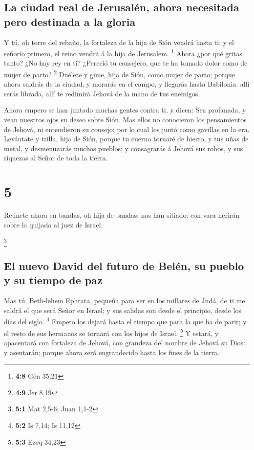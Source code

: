 \hypertarget{la-ciudad-real-de-jerusaluxe9n-ahora-necesitada-pero-destinada-a-la-gloria}{%
\subsection{La ciudad real de Jerusalén, ahora necesitada pero destinada
a la
gloria}\label{la-ciudad-real-de-jerusaluxe9n-ahora-necesitada-pero-destinada-a-la-gloria}}

 Y tú, oh torre del rebaño, la fortaleza de la hija de Sión
vendrá hasta ti: y el señorío primero, el reino vendrá á la hija de
Jerusalem. \footnote{\textbf{4:8} Gén 35,21}  Ahora ¿por qué
gritas tanto? ¿No hay rey en ti? ¿Pereció tu consejero, que te ha tomado
dolor como de mujer de parto? \footnote{\textbf{4:9} Jer 8,19}
 Duélete y gime, hija de Sión, como mujer de parto; porque
ahora saldrás de la ciudad, y morarás en el campo, y llegarás hasta
Babilonia: allí serás librada, allí te redimirá Jehová de la mano de tus
enemigos.

 Ahora empero se han juntado muchas gentes contra ti, y
dicen: Sea profanada, y vean nuestros ojos su deseo sobre Sión.
 Mas ellos no conocieron los pensamientos de Jehová, ni
entendieron su consejo: por lo cual los juntó como gavillas en la era.
 Levántate y trilla, hija de Sión, porque tu cuerno tornaré
de hierro, y tus uñas de metal, y desmenuzarás muchos pueblos; y
consagrarás á Jehová sus robos, y sus riquezas al Señor de toda la
tierra.

\hypertarget{section-4}{%
\section{5}\label{section-4}}

 Reúnete ahora en bandas, oh hija de bandas: nos han
sitiado: con vara herirán sobre la quijada al juez de Israel.

\footnote{\textbf{5:1} Mat 2,5-6; Juan 1,1-2}

\hypertarget{el-nuevo-david-del-futuro-de-beluxe9n-su-pueblo-y-su-tiempo-de-paz}{%
\subsection{El nuevo David del futuro de Belén, su pueblo y su tiempo de
paz}\label{el-nuevo-david-del-futuro-de-beluxe9n-su-pueblo-y-su-tiempo-de-paz}}

 Mas tú, Beth-lehem Ephrata, pequeña para ser en los
millares de Judá, de ti me saldrá el que será Señor en Israel; y sus
salidas son desde el principio, desde los días del siglo. \footnote{\textbf{5:2}
  Is 7,14; Is 11,12}  Empero los dejará hasta el tiempo que
para la que ha de parir; y el resto de sus hermanos se tornará con los
hijos de Israel. \footnote{\textbf{5:3} Ezeq 34,23}  Y
estará, y apacentará con fortaleza de Jehová, con grandeza del nombre de
Jehová su Dios: y asentarán; porque ahora será engrandecido hasta los
fines de la tierra.

